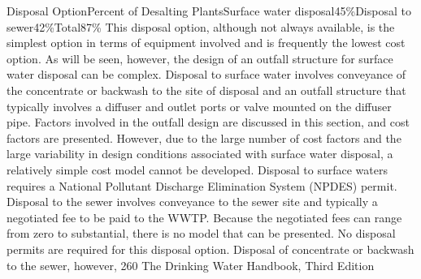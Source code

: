 \documentclass{article}
\begin{document}
Disposal OptionPercent of Desalting PlantsSurface water
disposal45\%Disposal to sewer42\%Total87\% This disposal option,
although not always available, is the simplest option in terms of
equipment involved and is frequently the lowest cost option. As will be
seen, however, the design of an outfall structure for surface water
disposal can be complex. Disposal to surface water involves conveyance
of the concentrate or backwash to the site of disposal and an outfall
structure that typically involves a diffuser and outlet ports or valve
mounted on the diffuser pipe. Factors involved in the outfall design are
discussed in this section, and cost factors are presented. However, due
to the large number of cost factors and the large variability in design
conditions associated with surface water disposal, a relatively simple
cost model cannot be developed. Disposal to surface waters requires a
National Pollutant Discharge Elimination System (NPDES) permit. Disposal
to the sewer involves conveyance to the sewer site and typically a
negotiated fee to be paid to the WWTP. Because the negotiated fees can
range from zero to substantial, there is no model that can be presented.
No disposal permits are required for this disposal option. Disposal of
concentrate or backwash to the sewer, however, 260 The Drinking Water
Handbook, Third Edition
\end{document}
